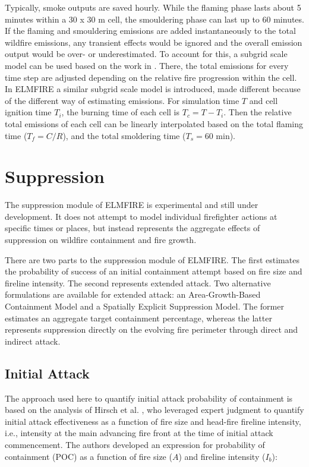 Typically, smoke outputs are saved hourly. While the flaming phase lasts about 5 minutes within a 30 x 30 m cell, the smouldering phase can last up to 60 minutes. If the flaming and smouldering emissions are added instantaneously to the total wildfire emissions, any transient effects would be ignored and the overall emission output would be over- or underestimated. To account for this, a subgrid scale model can be used based on the work in \cite{kalogeropoulosGaussianDispersionModel2025}. There, the total emissions for every time step are adjusted depending on the relative fire progression within the cell. In ELMFIRE a similar subgrid scale model is introduced, made different because of the different way of estimating emissions. For simulation time $T$ and cell ignition time $T_i$, the burning time of each cell is $T_c=T-T_i$. Then the relative total emissions of each cell can be linearly interpolated based on the total flaming time ($T_f=C/R$), and the total smoldering time ($T_s=60$ min). 


\section{Suppression}
\label{math_suppression}

The suppression module of ELMFIRE is experimental and still under development.
It does not attempt to model individual firefighter actions at specific times or
places, but instead represents the aggregate effects of suppression on wildfire
containment and fire growth.

There are two parts to the suppression module of ELMFIRE. The first estimates
the probability of success of an initial containment attempt based on fire size
and fireline intensity. The second represents extended attack. Two alternative
formulations are available for extended attack: an Area-Growth-Based Containment
Model and a Spatially Explicit Suppression Model. The former estimates an
aggregate target containment percentage, whereas the latter represents
suppression directly on the evolving fire perimeter through direct and indirect
attack.

\subsection{Initial Attack}

The approach used here to quantify initial attack probability of containment is
based on the analysis of Hirsch et al.
\cite{hirschUsingExpertJudgment1998}, who leveraged expert judgment to quantify
initial attack effectiveness as a function of fire size and head-fire fireline
intensity, i.e., intensity at the main advancing fire front at the time of
initial attack commencement. The authors developed an expression for probability
of containment (POC) as a function of fire size ($A$) and fireline intensity
($I_b$):

